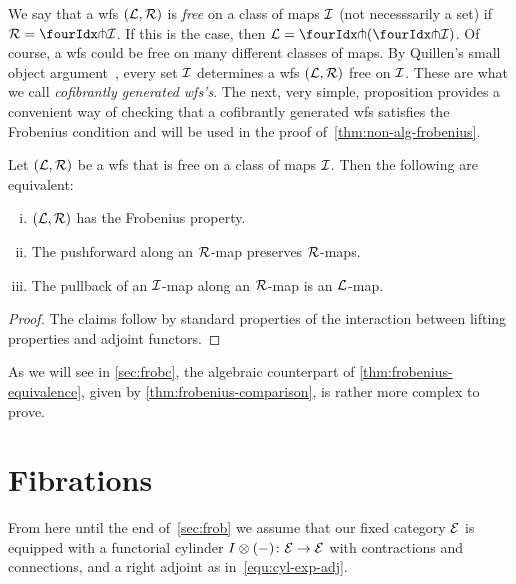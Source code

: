 \documentclass[reqno,10pt,a4paper,oneside,draft]{amsart}
\begin{document}
We say that a wfs $(\cal{L}, \cal{R})$ is \emph{free} on a class of maps $\cal{I}$ (not necesssarily a set) if 
$\cal{R} = \liftr{\cal{I}}$.
If this is the case, then $\cal{L} = \liftl{(\liftr{\cal{I}})}$.
Of course, a wfs could be free on many different classes of maps.
By Quillen's small object argument~\cite{quillen-homotopical}, every set $\cal{I}$ determines a wfs $(\cal{L}, 
\cal{R})$ free on $\cal{I}$.
These are what we call \emph{cofibrantly generated wfs's}.
The next, very simple, proposition provides a convenient way of checking that a cofibrantly generated wfs satisfies
the Frobenius condition and will be used in the proof of~\cref{thm:non-alg-frobenius}.

\begin{proposition} \label{thm:frobenius-equivalence}
Let $(\cal{L}, \cal{R})$ be a wfs that is free on a class of maps $\cal{I}$.
Then the following are equivalent:
\begin{enumerate}[(i)]
\item $(\cal{L}, \cal{R})$  has the Frobenius property.
\item The pushforward along an $\cal{R}$-map preserves $\cal{R}$-maps.
\item The pullback of an $\cal{I}$-map along an $\cal{R}$-map is an $\cal{L}$-map.
\end{enumerate}
\end{proposition}


\begin{proof} The claims follow by standard properties of the interaction between lifting properties and adjoint functors.
\end{proof}

As we will see in \cref{sec:frobc}, the algebraic counterpart of \cref{thm:frobenius-equivalence}, given by \cref{thm:frobenius-comparison}, is rather more complex to prove. 



\section{Fibrations}
\label{sec:fib}

From here until the end of~\cref{sec:frob} we assume that our fixed category $\catE$ is equipped with a functorial cylinder $\interval\otimes (-) \co \catE \to \catE$ with contractions and connections, and a right adjoint as in~\eqref{equ:cyl-exp-adj}.
\end{document}
